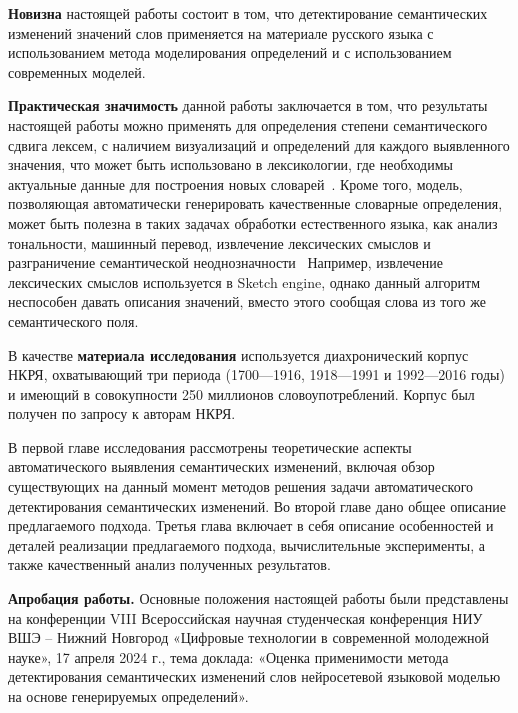 \documentclass[LI,VKR]{HSEUniversity}
\begin{document}
\textbf{Новизна} настоящей работы состоит в том, что детектирование семантических изменений
значений слов применяется на материале русского языка с использованием метода
моделирования определений и с использованием современных моделей.

\textbf{Практическая значимость} данной работы заключается в том, что результаты настоящей работы
можно применять для определения степени семантического сдвига лексем, с наличием визуализаций и
определений для каждого выявленного значения, что может быть использовано в лексикологии,
где необходимы актуальные данные для построения новых словарей~\cite{DefinitionGenerationMainArticle}.
Кроме того, модель, позволяющая автоматически генерировать качественные словарные определения,
может быть полезна в таких задачах обработки естественного языка, как анализ тональности,
машинный перевод, извлечение лексических смыслов и разграничение семантической неоднозначности~\cite{
    DefinitionModelingReviewAndDatasetAnalysis}
Например, извлечение лексических смыслов используется в Sketch engine,
однако данный алгоритм неспособен давать описания значений,
вместо этого сообщая слова из того же семантического поля.

В качестве \textbf{материала исследования} используется диахронический корпус НКРЯ, охватывающий
три периода (1700—1916, 1918—1991 и 1992—2016 годы) и имеющий в совокупности 250 миллионов
словоупотреблений.
Корпус был получен по запросу к авторам НКРЯ.

В первой главе исследования рассмотрены теоретические аспекты автоматического выявления
семантических изменений, включая обзор существующих на данный момент методов
решения задачи автоматического детектирования семантических изменений.
Во второй главе дано общее описание предлагаемого подхода.
Третья глава включает в себя описание особенностей и деталей
реализации предлагаемого подхода,
вычислительные эксперименты, а также качественный анализ полученных результатов.

\textbf{Апробация работы.}
Основные положения настоящей работы были представлены на конференции
VIII Всероссийская научная студенческая конференция НИУ ВШЭ – Нижний Новгород
«Цифровые технологии в современной молодежной науке», 17 апреля 2024 г.,
тема доклада: «Оценка применимости метода детектирования семантических изменений слов нейросетевой
языковой моделью на основе генерируемых определений».
\end{document}
